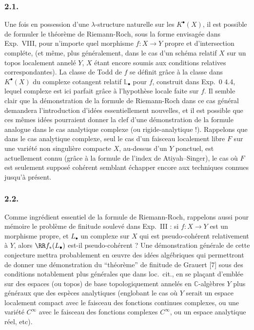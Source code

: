 \subsubsection*{2.1.}
Une fois en possession d'une $\lambda$-structure naturelle sur les $K^\bullet(X)$, il est possible de formuler le th\'eor\`eme de Riemann-Roch, sous la forme envisag\'ee dans Exp.\ VIII, pour n'importe quel morphisme $f : X \to Y$ propre et d'intersection compl\'ete, (et m\^eme, plus g\'en\'eralement, dans le cas d'un sch\'ema relatif $X$ sur un topos localement annel\'e $Y$, $X$ \'etant encore soumis aux conditions relatives correspondantes). La classe de Todd de $f$ se d\'efinit gr\^ace \`a la classe dans $K^\bullet(X)$ du complexe cotangent relatif $\mathbb{L}_\bullet$ pour $f$, construit dans Exp.\ 0 4.4, lequel complexe est ici parfait gr\^ace \`a l'hypoth\`ese locale faite sur $f$. Il semble clair que la d\'emonstration de la formule de Riemann-Roch dans ce cas g\'en\'eral demandera l'introduction d'id\'ees essentiellement nouvelles, et il est possible que ces m\^emes id\'ees pourraient donner la clef d'une d\'emonstration de la formule analogue dans le cas analytique complexe (ou rigide-analytique !). Rappelons que dans le cas analytique complexe, seul le cas d'un faisceau localement libre $F$ sur une vari\'et\'e non singuli\`ere compacte $X$, au-dessus d'un $Y$ ponctuel, est actuellement connu (gr\^ace \`a la formule de l'index de Atiyah--Singer), le cas o\`u $F$ est seulement suppos\'e coh\'erent semblant \'echapper encore aux techniques connues jusqu'\`a pr\'esent.

\subsubsection*{2.2.}
Comme ingr\'edient essentiel de la formule de Riemann-Roch, rappelons aussi pour m\'emoire le probl\`eme de finitude soulev\'e dans Exp.\ III : si $f : X \to Y$ est un morphisme propre, et $L_\bullet$ un complexe sur $X$ qui est pseudo-coh\'erent relativement \`a $Y$, alors $\RR f_*(L_\bullet)$ est-il pseudo-coh\'erent ? Une d\'emonstration g\'en\'erale de cette conjecture mettra probablement en \oe{}uvre des id\'ees alg\'ebriques qui permettront de donner une d\'emonstration du ``th\'eor\`eme'' de finitude de Grauert [7] sous des conditions notablement plus g\'en\'erales que dans loc.\ cit., en se pla\c{c}ant d'embl\'ee sur des espaces (ou topos) de base topologiquement annel\'es en $\mathbb{C}$-alg\`ebres $Y$ plus g\'en\'eraux que des esp\`eces analytiques (englobant le cas o\`u $Y$ serait un espace localement compact avec le faisceau des fonctions continues complexes, ou une vari\'et\'e $C^\infty$ avec le faisceau des fonctions complexes $C^\infty$, ou un espace analytique r\'eel, etc).

